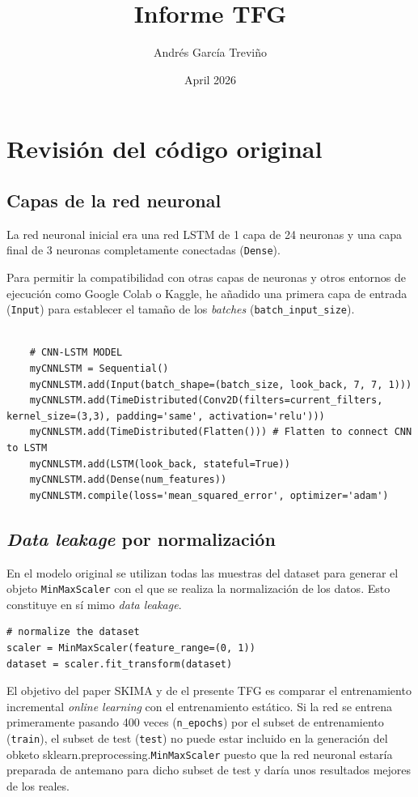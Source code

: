 \documentclass{article}
\title{Informe TFG}
\author{Andrés García Treviño}
\date{April 2026}
\begin{document}
\maketitle

\section{Revisión del código original}
\subsection{Capas de la red neuronal}
La red neuronal inicial era una red LSTM de 1 capa de 24 neuronas y una capa final de 3 neuronas completamente conectadas (\texttt{Dense}).

Para permitir la compatibilidad con otras capas de neuronas y otros entornos de ejecución como Google Colab o Kaggle, he añadido una primera capa de entrada (\texttt{Input}) para establecer el tamaño de los \textit{batches} (\texttt{batch\_input\_size}).

\begin{lstlisting}[style=pythonstyle, caption={Capa \texttt{Input} en la red CNN+LSTM}]

    # CNN-LSTM MODEL
    myCNNLSTM = Sequential()
    myCNNLSTM.add(Input(batch_shape=(batch_size, look_back, 7, 7, 1)))
    myCNNLSTM.add(TimeDistributed(Conv2D(filters=current_filters, kernel_size=(3,3), padding='same', activation='relu')))
    myCNNLSTM.add(TimeDistributed(Flatten())) # Flatten to connect CNN to LSTM
    myCNNLSTM.add(LSTM(look_back, stateful=True))
    myCNNLSTM.add(Dense(num_features))
    myCNNLSTM.compile(loss='mean_squared_error', optimizer='adam')
\end{lstlisting}

\subsection{\textit{Data leakage} por normalización}
En el modelo original se utilizan todas las muestras del dataset para generar el objeto \texttt{MinMaxScaler} con el que se realiza la normalización de los datos. Esto constituye en sí mimo \textit{data leakage}.
\begin{lstlisting}[style=pythonstyle, caption={\textit{Data leakage} original}]
# normalize the dataset
scaler = MinMaxScaler(feature_range=(0, 1))
dataset = scaler.fit_transform(dataset)
\end{lstlisting}

El objetivo del paper SKIMA y de el presente TFG es comparar el entrenamiento incremental \textit{online learning} con el entrenamiento estático. Si la red se entrena primeramente pasando 400 veces (\texttt{n\_epochs}) por el subset de entrenamiento (\texttt{train}), el subset de test (\texttt{test}) no puede estar incluido en la generación del obketo sklearn.preprocessing.\texttt{MinMaxScaler} puesto que la red neuronal estaría preparada de antemano para dicho subset de test y daría unos resultados mejores de los reales.
\end{document}
